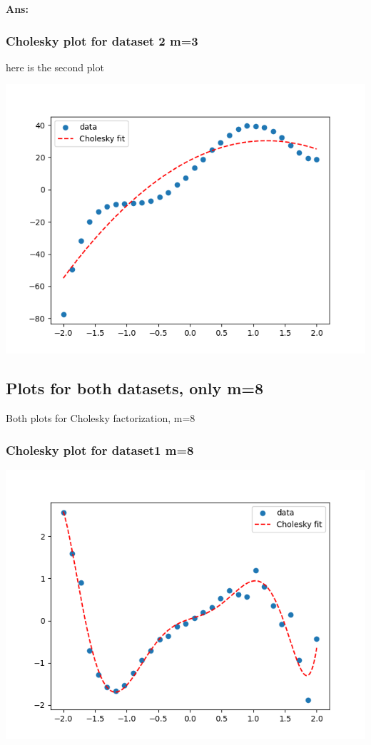 \documentclass[11pt]{article}
\newenvironment{solbox}
  {\begin{mdframed}[linewidth=1pt,linecolor=black,roundcorner=5pt]
   \noindent\textbf{Ans: }\enspace}
  {\end{mdframed}}
\begin{document}
\begin{solbox}
    \subsubsection{Cholesky plot for dataset 2 m=3}

    here is the second plot 
    \begin{center}
    \includegraphics[width=0.75\linewidth]{../Figures/M3Chol_plot_dataset2.png}
    \end{center}

    \subsection{Plots for both datasets, only m=8}

    Both plots for Cholesky factorization, m=8
    
    \subsubsection{Cholesky plot for dataset1 m=8}

    \begin{center}
    \includegraphics[width=0.75\linewidth]{../Figures/M8Chol_plot_dataset1.png}
    \end{center}



\end{solbox}
\end{document}

